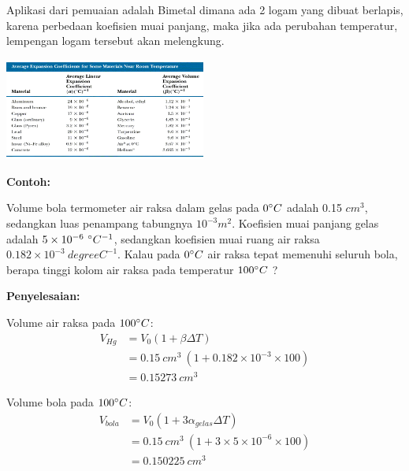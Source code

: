 \documentclass[twocolumn, 11pt]{article}%
\begin{document}
        Aplikasi dari pemuaian adalah Bimetal dimana ada 2 logam yang dibuat berlapis, karena perbedaan koefisien muai panjang, maka jika ada perubahan temperatur, lempengan logam tersebut akan melengkung.

        \begin{center}
            \includegraphics[width=250px]{4.png}
        \end{center}

        \textbf{Contoh:}

        Volume bola termometer air raksa dalam gelas pada $0\degree C$ adalah 0.15 $cm^3$, sedangkan luas penampang tabungnya $10^{-3} m^2$. Koefisien muai panjang gelas adalah $5\times10^{-6}\ \degree C^{-1}$, sedangkan koefisien muai ruang air raksa $0.182 \times 10^{-3}\ degree C^{-1}$. Kalau pada $0\degree C$ air raksa tepat memenuhi seluruh bola, berapa tinggi kolom air raksa pada temperatur $100 \degree C$ ?

        \textbf{Penyelesaian:}

        Volume air raksa pada $100 \degree C$:
        \begin{equation*}
            \begin{split}
                V_{Hg} &= V_0 (1+ \beta \Delta T)\\
                &= 0.15\ cm^3\ (1+ 0.182 \times 10^{-3} \times 100)\\
                &= 0.15273\ cm^3
            \end{split}
        \end{equation*}
        
        Volume bola pada $100 \degree C$:
        \begin{equation*}
            \begin{split}
                V_{bola} &= V_0 (1+ 3\alpha_{gelas} \Delta T)\\
                &= 0.15\ cm^3\ (1+ 3 \times 5 \times 10^{-6} \times 100)\\
                &= 0.150225\ cm^3
            \end{split}
        \end{equation*}
        
\end{document}
